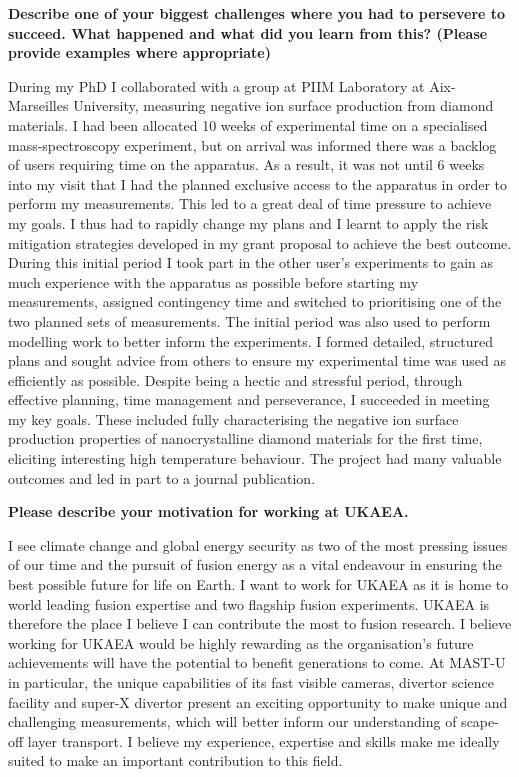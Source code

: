 \documentclass[11pt,a4paper,sans]{moderncv}        %
\begin{document}
\textbf{Describe one of your biggest challenges where you had to persevere to succeed. What happened and what did you learn from this? (Please provide examples where appropriate)} 

During my PhD I collaborated with a group at PIIM Laboratory at Aix-Marseilles University, measuring negative ion surface production from diamond materials. I had been allocated 10 weeks of experimental time on a specialised mass-spectroscopy experiment, but on arrival was informed there was a backlog of users requiring time on the apparatus. As a result, it was not until 6 weeks into my visit that I had the planned exclusive access to the apparatus in order to perform my measurements. This led to a great deal of time pressure to achieve my goals. I thus had to rapidly change my plans and I learnt to apply the risk mitigation strategies developed in my grant proposal to achieve the best outcome. 
During this initial period I took part in the other user's experiments to gain as much experience with the apparatus as possible before starting my measurements, assigned contingency time and switched to prioritising one of the two planned sets of measurements. The initial period was also used to perform modelling work to better inform the experiments. I formed detailed, structured plans and sought advice from others to ensure my experimental time was used as efficiently as possible. Despite being a hectic and stressful period, through effective planning, time management and perseverance, I succeeded in meeting my key goals. These included fully characterising the negative ion surface production properties of nanocrystalline diamond materials for the first time, eliciting interesting high temperature behaviour. The project had many valuable outcomes and led in part to a journal publication.

\textbf{Please describe your motivation for working at UKAEA.}

I see climate change and global energy security as two of the most pressing issues of our time and the pursuit of fusion energy as a vital endeavour in ensuring the best possible future for life on Earth. I want to work for UKAEA as it is home to world leading fusion expertise and two flagship fusion experiments. UKAEA is therefore the place I believe I can contribute the most to fusion research. I believe working for UKAEA would be highly rewarding as the organisation's future achievements will have the potential to benefit generations to come. At MAST-U in particular, the unique capabilities of its fast visible cameras, divertor science facility and super-X divertor present an exciting opportunity to make unique and challenging measurements, which will better inform our understanding of scape-off layer transport. I believe my experience, expertise and skills make me ideally suited to make an important contribution to this field.
\end{document}
